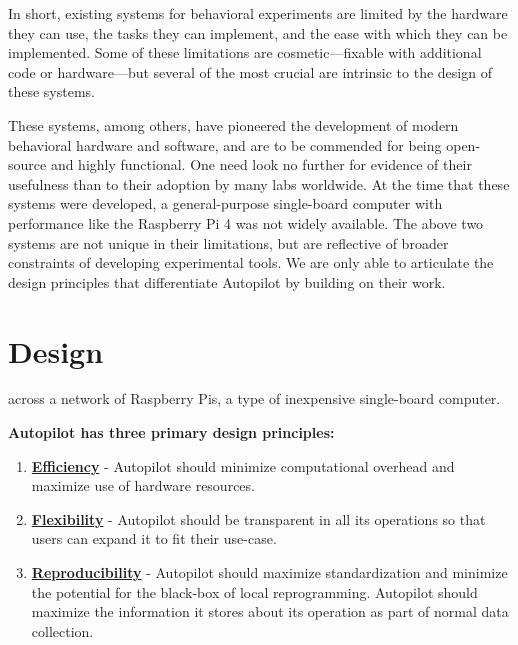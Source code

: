 In short, existing systems for behavioral experiments are limited by the hardware they can use, the tasks they can implement, and the ease with which they can be implemented. Some of these limitations are cosmetic---fixable with additional code or hardware---but several of the most crucial are intrinsic to the design of these systems.

These systems, among others, have pioneered the development of modern behavioral hardware and software, and are to be commended for being open-source and highly functional. One need look no further for evidence of their usefulness than to their adoption by many labs worldwide. At the time that these systems were developed, a general-purpose single-board computer with performance like the Raspberry Pi 4 was not widely available. The above two systems are not unique in their limitations, but are reflective of broader constraints of developing experimental tools. We are only able to articulate the design principles that differentiate Autopilot by building on their work. 


\chapter{Design}
\label{sec:design}

 across a network of Raspberry Pis, a type of inexpensive single-board computer. 

\vspace{12pt}

\textbf{Autopilot has three primary design principles:}

\begin{enumerate}
    \item \hyperref[sec:efficiency]{\textbf{Efficiency}} - Autopilot should minimize computational overhead and maximize use of hardware resources.
    \item \hyperref[sec:flexibility]{\textbf{Flexibility}} - Autopilot should be transparent in all its operations so that users can expand it to fit their use-case.
    \item \hyperref[sec:reproducibility]{\textbf{Reproducibility}} - Autopilot should maximize standardization and minimize the potential for the black-box of local reprogramming. Autopilot should maximize the information it stores about its operation as part of normal data collection.
\end{enumerate}


